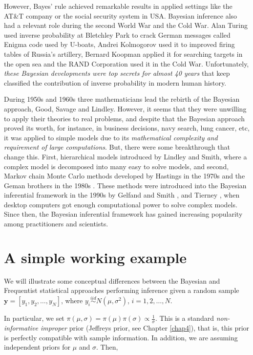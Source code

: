However, Bayes' rule achieved remarkable results in applied settings like the AT\&T company or the social security system in USA. Bayesian inference also had a relevant role during the second World War and the Cold War. Alan Turing used inverse probability at Bletchley Park to crack German messages called Enigma code used by U-boats, Andrei Kolmogorov used it to improved firing tables of Russia's artillery, Bernard Koopman applied it for searching targets in the open sea and the RAND Corporation used it in the Cold War. Unfortunately, \textit{these Bayesian developments were top secrets for almost 40 years} that keep classified the contribution of inverse probability in modern human history.

During 1950s and 1960s three mathematicians lead the rebirth of the Bayesian approach, Good, Savage and Lindley. However, it seems that they were unwilling to apply their theories to real problems, and despite that the Bayesian approach proved its worth, for instance, in business decisions, navy search, lung cancer, etc, it was applied to simple models due to its \textit{mathematical complexity and requirement of large computations}. But, there were some breakthrough that change this. First, hierarchical models introduced by Lindley and Smith, where a complex model is decomposed into many easy to solve models, and second, Markov chain Monte Carlo methods developed by Hastings in the 1970s \cite{hastings70} and the Geman brothers in the 1980s \cite{Geman1984}. These methods were introduced into the Bayesian inferential framework in the 1990s by Gelfand and Smith \cite{Gelfand1990}, and Tierney \cite{tierney1994markov}, when desktop computers got enough computational power to solve complex models. Since then, the Bayesian inferential framework has gained increasing popularity among practitioners and scientists.

\section{A simple working example}\label{sec26}

We will illustrate some conceptual differences between the Bayesian and Frequentist statistical approaches performing inference given a random sample $\mathbf{y}=[y_1,y_2,\dots,y_N]$, where $y_i\stackrel{iid}{\sim} N(\mu, \sigma^2)$, $i=1,2,\dots,N$.

In particular, we set $\pi(\mu,\sigma)=\pi(\mu)\pi(\sigma)\propto \frac{1}{\sigma}$. This is a standard \textit{non-informative improper} prior (Jeffreys prior, see Chapter \ref{chap4}), that is, this prior is perfectly compatible with sample information. In addition, we are assuming independent priors for $\mu$ and $\sigma$. Then,

